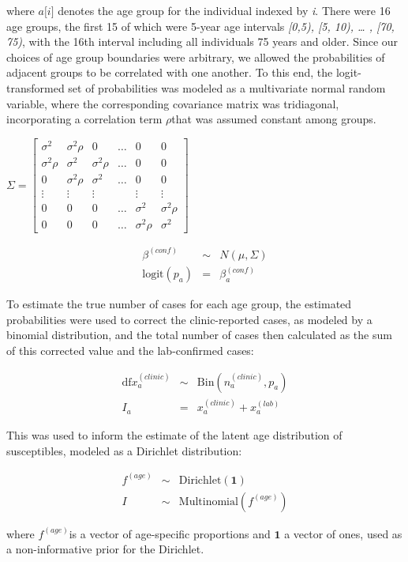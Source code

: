 where \(a\lbrack i\rbrack\) denotes the age group for the individual
indexed by \emph{i}. There were 16 age groups, the first 15 of which
were 5-year age intervals \emph{{[}0,5), {[}5, 10), \ldots{} , {[}70,
75)}, with the 16th interval including all individuals 75 years and
older. Since our choices of age group boundaries were arbitrary, we
allowed the probabilities of adjacent groups to be correlated with one
another. To this end, the logit-transformed set of probabilities was
modeled as a multivariate normal random variable, where the
corresponding covariance matrix was tridiagonal, incorporating a
correlation term \(\rho\)that was assumed constant among groups.

\(
\Sigma = \left[{
\begin{array}{c}
  {\sigma^2} & {\sigma^2 \rho} & 0& \ldots & {0} & {0}  \\
  {\sigma^2 \rho} & {\sigma^2} &  \sigma^2 \rho & \ldots & {0}  & {0} \\
  {0} & \sigma^2 \rho & {\sigma^2} & \ldots & {0} & {0} \\
  \vdots & \vdots & \vdots &  & \vdots & \vdots\\
  {0} & {0} & 0 & \ldots &  {\sigma^2} & \sigma^2 \rho  \\
{0} & {0} & 0 & \ldots & \sigma^2 \rho &  {\sigma^2} 
\end{array}
}\right]\)

\begin{eqnarray}
\beta^{(conf)} &\sim& N(\mu, \Sigma) \\
\text{logit}(p_a) &=& \beta_a^{(conf)}
\end{eqnarray}

To estimate the true number of cases for each age group, the estimated probabilities were used to correct the clinic-reported cases, as modeled by a binomial distribution, and the total number of cases then calculated as the sum of this corrected value and the lab-confirmed cases:

\begin{eqnarray}
\text{df}x_a^{(clinic)} &\sim& \text{Bin}(n_a^{(clinic)},p_a) \\
I_a &=& x_a^{(clinic)}+x_a^{(lab)}
\end{eqnarray}

This was used to inform the estimate of the latent age distribution of susceptibles, modeled as a Dirichlet distribution:

\begin{eqnarray}
f^{(age)} &\sim& \text{Dirichlet}(\mathbf{1}) \\
I &\sim& \text{Multinomial}(f^{(age)})
\end{eqnarray}

where \(f^{(age)}\)is a vector of age-specific proportions and \(\mathbf{1}\) a vector of ones, used as a non-informative prior for the Dirichlet.